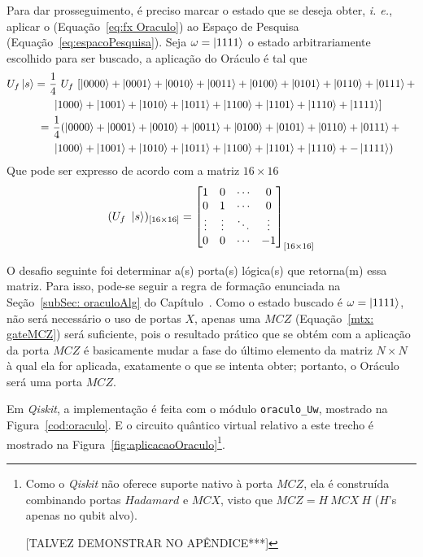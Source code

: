 Para dar prosseguimento, é preciso marcar o estado que se deseja obter, \emph{i. e.}, aplicar o  (Equaç\~{a}o~\ref{eq:fx Oraculo}) ao Espaço de Pesquisa (Equaç\~{a}o~\ref{eq:espacoPesquisa}). Seja $\omega = \ket{1111}$ o estado arbitrariamente escolhido para ser buscado, a aplicação do Oráculo é tal que
%
\begin{align}
    \notag
    U_f\ket{s} = ~& \frac{1}{4}~U_f~[\ket{0000} + \ket{0001} + \ket{0010} + \ket{0011} + \ket{0100} + \ket{0101} + \ket{0110} +\ket{0111} + \\ \notag
    &~ \ket{1000} + \ket{1001} + \ket{1010} + \ket{1011} + \ket{1100} + \ket{1101} + \ket{1110} + \ket{1111}] \\
    \label{eq:aplicacaoOraculo}
    = &~ \frac{1}{4}(\ket{0000} + \ket{0001} + \ket{0010} + \ket{0011} + \ket{0100} + \ket{0101} + \ket{0110} +\ket{0111} + \\ \notag
    &~ \ket{1000} + \ket{1001} + \ket{1010} + \ket{1011} + \ket{1100} + \ket{1101} + \ket{1110} + -\ket{1111})
\end{align}
%
Que pode ser expresso de acordo com a matriz $16 \times 16$
%
\begin{equation*}
    (U_{f}~\ket{s})_{[16 \times 16]} = \begin{bmatrix}
        1 & 0 &  \cdots  & 0\\
        0 & 1 &  \cdots  & 0\\
        \vdots & \vdots & \ddots & \vdots \\
        0 & 0 &  \cdots  & -1\\
    \end{bmatrix}_{[16 \times 16]} 
    \label{mtx: aplicacaoOraculo}
\end{equation*}

O desafio seguinte foi determinar a(s) porta(s) lógica(s) que retorna(m) essa matriz. Para isso, pode-se seguir a regra de formação enunciada na Seção~\ref{subSec: oraculoAlg} do Capítulo~. Como o estado buscado é $\omega = \ket{1111}$, não será necessário o uso de portas $X$, apenas uma $MCZ$ (Equação~\ref{mtx: gateMCZ}) será suficiente, pois o resultado prático que se obtém com a aplicação da porta $MCZ$ é basicamente mudar a fase do último elemento da matriz $N \times N$ à qual ela for aplicada, exatamente o que se intenta obter; portanto, o Oráculo será uma porta $MCZ$.

Em \emph{Qiskit}, a implementação é feita com o módulo \verb|oraculo_Uw|, mostrado na Figura~\ref{cod:oraculo}. E o circuito quântico virtual relativo a este trecho é mostrado na Figura~\ref{fig:aplicacaoOraculo}\footnote
{
Como o \emph{Qiskit} não oferece suporte nativo à porta $MCZ$, ela é construída combinando portas $Hadamard$ e $MCX$, visto que $MCZ=H~MCX~H$ ($H$'s apenas no qubit alvo).

[TALVEZ DEMONSTRAR NO APÊNDICE***]
}.

